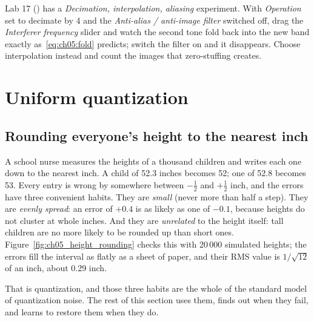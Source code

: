 \begin{tryit}
Lab 17 () has a \emph{Decimation, interpolation, aliasing}
experiment. With \emph{Operation} set to decimate by 4 and the \emph{Anti-alias / anti-image
filter} switched off, drag the \emph{Interferer frequency} slider and watch the second tone fold
back into the new band exactly as~\eqref{eq:ch05:fold} predicts; switch the filter on and it
disappears. Choose interpolation instead and count the images that zero-stuffing creates.
\end{tryit}


\section{Uniform quantization}
\label{sec:ch05:quant}

\subsection{Rounding everyone's height to the nearest inch}

A school nurse measures the heights of a thousand children and writes each one down to the
nearest inch. A child of 52.3 inches becomes 52; one of 52.8 becomes 53. Every entry is wrong by
somewhere between $-\frac12$ and $+\frac12$ inch, and the errors have three convenient habits. They
are \emph{small} (never more than half a step). They are \emph{evenly spread}: an error of
$+0.4$ is as likely as one of $-0.1$, because heights do not cluster at whole inches. And they
are \emph{unrelated} to the height itself: tall children are no more likely to be rounded up than
short ones. Figure~\ref{fig:ch05_height_rounding} checks this with 20\,000 simulated heights; the
errors fill the interval as flatly as a sheet of paper, and their RMS value is $1/\sqrt{12}$ of an
inch, about 0.29 inch.

That is quantization, and those three habits are the whole of the standard model of quantization
noise. The rest of this section uses them, finds out when they fail, and learns to restore them
when they do.

